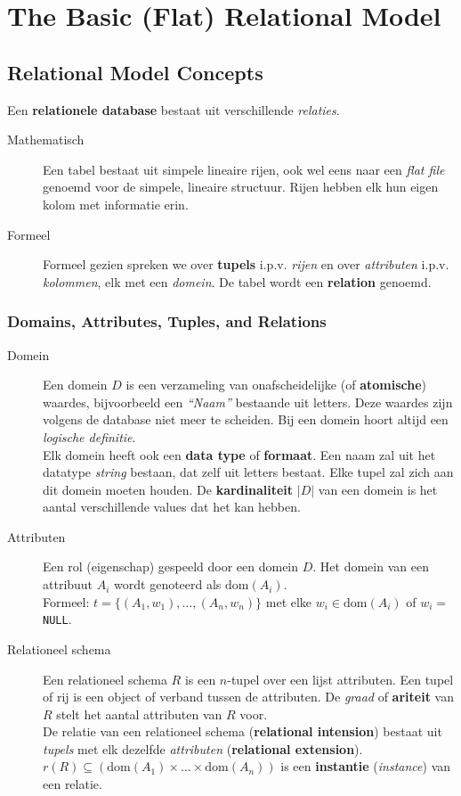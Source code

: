 \chapter{The Basic (Flat) Relational Model}

\section{Relational Model Concepts}
Een \textbf{relationele database} bestaat uit verschillende \textit{relaties}. 
\begin{description}
	\item[Mathematisch] Een tabel bestaat uit simpele lineaire rijen, ook wel eens naar een \textit{flat file} genoemd voor de simpele, lineaire structuur. Rijen hebben elk hun eigen kolom met informatie erin.
	\item[Formeel] Formeel gezien spreken we over \textbf{tupels} i.p.v. \textit{rijen} en over \textit{attributen} i.p.v. \textit{kolommen}, elk met een \textit{domein}. De tabel wordt een \textbf{relation} genoemd.
\end{description}

\subsection{Domains, Attributes, Tuples, and Relations}
\begin{description}
	\item[Domein] Een domein $D$ is een verzameling van onafscheidelijke (of \textbf{atomische}) waardes, bijvoorbeeld een \textit{``Naam''} bestaande uit letters. Deze waardes zijn volgens de database niet meer te scheiden. Bij een domein hoort altijd een \textit{logische definitie}.\\
	Elk domein heeft ook een \textbf{data type} of \textbf{formaat}. Een naam zal uit het datatype \textit{string} bestaan, dat zelf uit letters bestaat. Elke tupel zal zich aan dit domein moeten houden. De \textbf{kardinaliteit} $|D|$ van een domein is het aantal verschillende values dat het kan hebben.
	\item[Attributen] Een rol (eigenschap) gespeeld door een domein $D$. Het domein van een attribuut $A_i$ wordt genoteerd als $\text{dom}(A_i)$.\\
	Formeel: $t = \{(A_1, w_1), \dots, (A_n, w_n)\}$ met elke $w_i \in \text{dom}(A_i)$ of $w_i =$ \texttt{NULL}.
	\item[Relationeel schema] Een relationeel schema $R$ is een $n$-tupel over een lijst attributen. Een tupel of rij is een object of verband tussen de attributen. De \textit{graad} of \textbf{ariteit} van $R$ stelt het aantal attributen van $R$ voor.\\
	De relatie van een relationeel schema (\textbf{relational intension}) bestaat uit \textit{tupels} met elk dezelfde \textit{attributen} (\textbf{relational extension}).\\
	$r(R) \subseteq ( \text{dom}(A_1) \times \dots \times \text{dom}(A_n))$ is een \textbf{instantie} (\textit{instance}) van een relatie.
\end{description}

